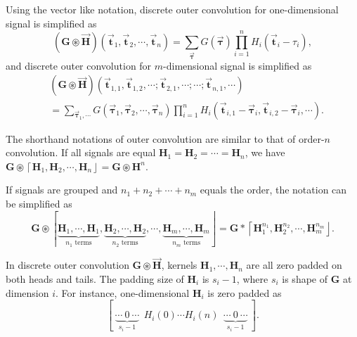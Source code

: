 \documentclass[twoside,11pt]{article}
\def\oconv{\circledast}
\def\tvar#1{\mathbf{#1}} %
\def\vsymb#1{\vec{\mathbf{#1}}}
\def\lcerfl#1{\left\lceil{#1}\right\rfloor}
\begin{document}
Using the vector like notation, discrete outer convolution for one-dimensional signal is simplified as
\begin{equation}
  \left( \tvar{G} \oconv \vsymb{H} \right)(\vsymb{t}_1, \vsymb{t}_2, \cdots, \vsymb{t}_n)
  = \sum_{\vsymb{\tau}} G(\vsymb{\tau}) \prod_{i=1}^{n} H_i(\vsymb{t}_i - \tau_i),
  \label{equ:def-descrete-outer-convolution-1d}
\end{equation}
and discrete outer convolution for \(m\)-dimensional signal is simplified as
\begin{equation}
  \begin{aligned}
     & \left( \tvar{G} \oconv \vsymb{H} \right)(\vsymb{t}_{1,1}, \vsymb{t}_{1,2}, \cdots; \vsymb{t}_{2,1}, \cdots; \cdots; \vsymb{t}_{n,1}, \cdots)                                               \\
     & = \sum_{\vsymb{\tau}_1, \cdots} G(\vsymb{\tau}_1, \vsymb{\tau}_2, \cdots, \vsymb{\tau}_n) \prod_{i=1}^{n} H_i(\vsymb{t}_{i,1} - \vsymb{\tau}_i, \vsymb{t}_{i,2} - \vsymb{\tau}_i, \cdots).
  \end{aligned}
  \label{equ:def-descrete-outer-convolution-md}
\end{equation}

The shorthand notations of outer convolution are similar to that of order-\(n\) convolution.
If all signals are equal \(\tvar{H}_1 = \tvar{H}_2 = \cdots = \tvar{H}_n\), we have \(\tvar{G} \oconv \lcerfl{\tvar{H}_1, \tvar{H}_2, \cdots, \tvar{H}_n} = \tvar{G} \oconv \tvar{H}^n\).

If signals are grouped and \(n_1 + n_2 + \cdots + n_m\) equals the order, the notation can be simplified as
\begin{equation*}
  \tvar{G} \oconv \lcerfl{
    \underbrace{\tvar{H}_1, \cdots, \tvar{H}_1}_{n_1 \text{ terms}},
    \underbrace{\tvar{H}_2, \cdots, \tvar{H}_2}_{n_2 \text{ terms}},
    \cdots,
    \underbrace{\tvar{H}_m, \cdots, \tvar{H}_m}_{n_m \text{ terms}}
  } = \tvar{G} * \lcerfl{
  \tvar{H}_1^{n_1},
  \tvar{H}_2^{n_2},
  \cdots,
  \tvar{H}_m^{n_m}
  }.
\end{equation*}

\begin{remark}
  In discrete outer convolution \(\tvar{G} \oconv \vsymb{H}\), kernels \(\tvar{H}_1, \cdots, \tvar{H}_n\) are all zero padded on both heads and tails. The padding size of \(\tvar{H}_i\) is \(s_i - 1\), where \(s_i\) is shape of \(\tvar{G}\) at dimension \(i\). For instance, one-dimensional \(\tvar{H}_i\) is zero padded as
  \begin{equation*}
    \left[ ~ \underbrace{\cdots ~ 0 ~ \cdots}_{s_i - 1} ~~ H_i(0) \cdots H_i(n) ~~ \underbrace{\cdots ~ 0 ~ \cdots}_{s_i-1} ~ \right].
  \end{equation*}
\end{remark}
\end{document}
